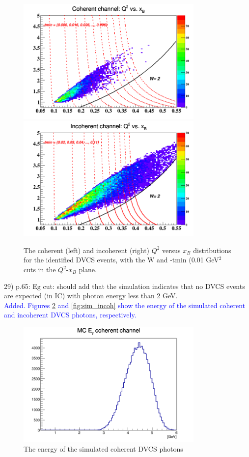 \begin{figure}[tbp]
\includegraphics[height=6.2cm]{fig/coh_Q2_xB.png}
\includegraphics[height=6.2cm]{fig/incoh_Q2_xB.png}
\caption{The coherent (left) and incoherent (right) $Q^{2}$ versus $x_{B}$ 
   distributions for the identified DVCS events, with the W and -tmin (0.01 
GeV$^{2}$ cuts in the $Q^{2}$-$x_{B}$ plane.}
\label{fig:Q2_xB}
 \end{figure}


29) p.65: Eg cut: should add that the simulation indicates that no DVCS events 
are expected (in IC) with photon energy less than 2 GeV. \\
\textcolor{blue}{ Added. Figures \ref{fig:sim_coh} and \ref{fig:sim_incoh} show 
the energy of the simulated coherent and incoherent DVCS photons, respectively.  
}\\

\begin{figure}[tbp]
\centering
\includegraphics[height=6.2cm]{fig/photon_energy_coh_sim.png}
\caption{The energy of the simulated coherent DVCS photons}
\label{fig:sim_coh}
 \end{figure}


